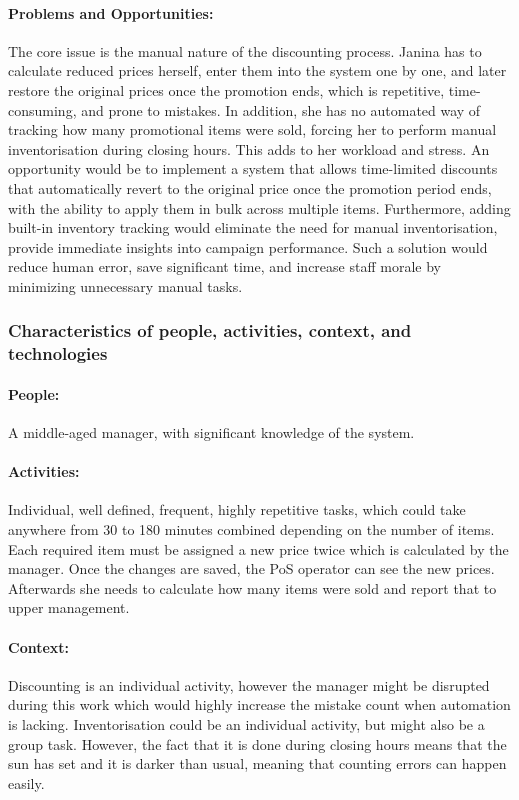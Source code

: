 \documentclass{article}
\begin{document}
\paragraph{\small Problems and Opportunities:} The core issue is the manual nature of the discounting process. Janina has to calculate reduced prices herself, enter them into the system one by one, and later restore the original prices once the promotion ends, which is repetitive, time-consuming, and prone to mistakes. In addition, she has no automated way of tracking how many promotional items were sold, forcing her to perform manual inventorisation during closing hours. This adds to her workload and stress. An opportunity would be to implement a system that allows time-limited discounts that automatically revert to the original price once the promotion period ends, with the ability to apply them in bulk across multiple items. Furthermore, adding built-in inventory tracking would eliminate the need for manual inventorisation, provide immediate insights into campaign performance. Such a solution would reduce human error, save significant time, and increase staff morale by minimizing unnecessary manual tasks.

\subsubsection{Characteristics of people, activities, context, and technologies}
\paragraph{\small People:} A middle-aged manager, with significant knowledge of the system.
\paragraph{\small Activities:} Individual, well defined, frequent, highly repetitive tasks, which could take anywhere from 30 to 180 minutes combined depending on the number of items. Each required item must be assigned a new price twice which is calculated by the manager. Once the changes are saved, the PoS operator can see the new prices. Afterwards she needs to calculate how many items were sold and report that to upper management.
\paragraph{\small Context:} Discounting is an individual activity, however the manager might be disrupted during this work which would highly increase the mistake count when automation is lacking. Inventorisation could be an individual activity, but might also be a group task. However, the fact that it is done during closing hours means that the sun has set and it is darker than usual, meaning that counting errors can happen easily.
\end{document}
